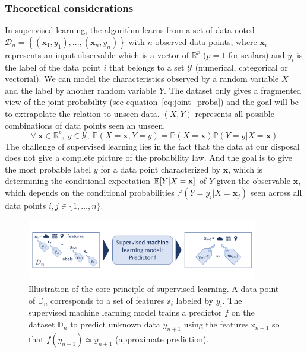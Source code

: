 \documentclass[main]{subfiles}
\begin{document}
\subsubsection{Theoretical considerations}

In supervised learning, the algorithm learns from a set of data noted $\mathcal{D}_{n}=\left\{(\mathbf{x}_{1},y_{1}),...,(\mathbf{x}_{n},y_{n})\right\}$ with $n$ observed data points, where $\mathbf{x}_{i}$ represents an input observable which is a vector of $\mathbb{R}^{p}$ ($p=1$ for scalars) and $y_{i}$ is the label of the data point $i$ that belongs to a set $\mathcal{Y}$ (numerical, categorical or vectorial). 
We can model the characteristics observed by a random variable $X$ and the label by another random variable $Y$. The dataset only gives a fragmented view of the joint probability (see equation~\ref{eq:joint_proba}) and the goal will be to extrapolate the relation to unseen data. $(X,Y)$ represents all possible combinations of data points seen an unseen.
\begin{equation}\label{eq:joint_proba}
  \forall\ \mathbf{x}\in\mathbb{R}^{p},\ y\in\mathcal{Y},\ \mathbb{P}\left(X=\mathbf{x}, Y=y\right) = \mathbb{P}(X=\mathbf{x})\mathbb{P}(Y=y|X=\mathbf{x})
\end{equation}
The challenge of supervised learning lies in the fact that the data at our disposal does not give a complete picture of the probability law. And the goal is to give the most probable label $y$ for a data point characterized by $\mathbf{x}$, which is determining the conditional expectation $\mathbb{E}{\left[Y|X=\mathbf{x}\right]}$ of $Y$ given the observable $\mathbf{x}$, which depends on the conditional probabilities $\mathbb{P}(Y=y_i|X=\mathbf{x}_j)$ seen across all data points $i,j\in\{1,\ldots,n\}$.

\begin{figure}[ht]
  \centering
    \includegraphics[width=0.9\textwidth]{figures/4-ml/machine learning.pdf}
    \caption{Illustration of the core principle of supervised learning. A data point of $\mathbb{D}_n$ corresponds to a set of features $\mathbb{x}_i$ labeled by $y_i$. The supervised machine learning model trains a predictor $f$ on the dataset $\mathbb{D}_n$ to predict unknown data $y_{n+1}$ using the features $\mathbb{x}_{n+1}$ so that $f(y_{n+1})\simeq y_{n+1}$ (approximate prediction).}\label{fgr:supervised_leaning}
\end{figure}
\end{document}
